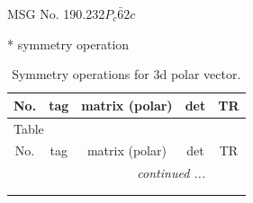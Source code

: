 \documentclass[fleqn,8pt]{jsarticle}
\begin{document}
\setcounter{MaxMatrixCols}{32}

\renewcommand{\tablename}{Table~}
\renewcommand{\figurename}{Figure~}
\begin{center}
\LARGE
MSG No. 190.232\quad$P_{c}\bar{6}2c$
\end{center}
* symmetry operation
\renewcommand{\arraystretch}{1.3}
\begin{longtable}{ccccc}
\caption{Symmetry operations for 3d polar vector.}
 \\
 \hline \hline
No. & tag & matrix (polar) & det & TR \\ \hline \endfirsthead

\multicolumn{4}{l}{\tablename\ \thetable{}} \\
 \hline \hline
No. & tag & matrix (polar) & det & TR \\ \hline \endhead

 \hline \hline
\multicolumn{4}{r}{\footnotesize\it continued ...} \\ \endfoot

 \hline \hline
\multicolumn{4}{r}{} \\ \endlastfoot


\end{longtable}
\end{document}
